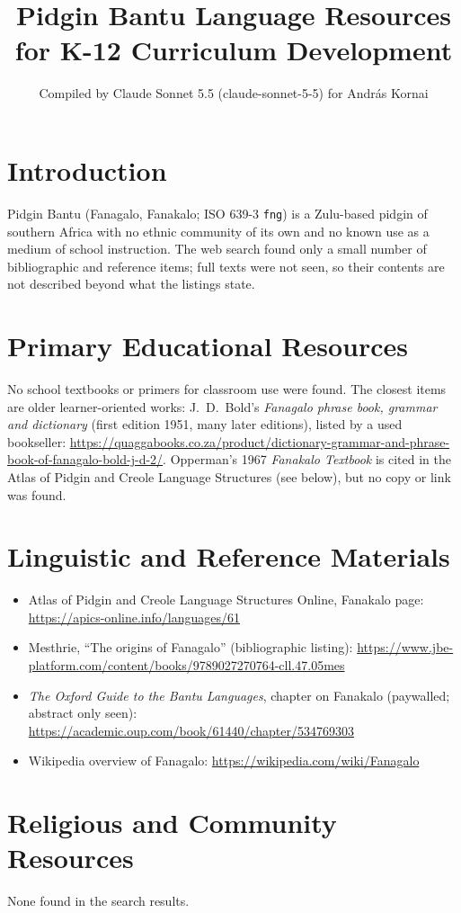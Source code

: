 \documentclass[12pt]{article}
\title{Pidgin Bantu Language Resources for K-12 Curriculum Development}
\author{Compiled by Claude Sonnet 5.5 (claude-sonnet-5-5) for Andr\'as Kornai}
\date{}
\begin{document}
\maketitle

\section{Introduction}
Pidgin Bantu (Fanagalo, Fanakalo; ISO 639-3 \texttt{fng}) is a Zulu-based pidgin of southern Africa with no ethnic community of its own and no known use as a medium of school instruction. The web search found only a small number of bibliographic and reference items; full texts were not seen, so their contents are not described beyond what the listings state.

\section{Primary Educational Resources}
No school textbooks or primers for classroom use were found. The closest items are older learner-oriented works: J.\ D.\ Bold's \emph{Fanagalo phrase book, grammar and dictionary} (first edition 1951, many later editions), listed by a used bookseller: \url{https://quaggabooks.co.za/product/dictionary-grammar-and-phrase-book-of-fanagalo-bold-j-d-2/}. Opperman's 1967 \emph{Fanakalo Textbook} is cited in the Atlas of Pidgin and Creole Language Structures (see below), but no copy or link was found.

\section{Linguistic and Reference Materials}
\begin{itemize}
\item Atlas of Pidgin and Creole Language Structures Online, Fanakalo page: \url{https://apics-online.info/languages/61}
\item Mesthrie, ``The origins of Fanagalo'' (bibliographic listing): \url{https://www.jbe-platform.com/content/books/9789027270764-cll.47.05mes}
\item \emph{The Oxford Guide to the Bantu Languages}, chapter on Fanakalo (paywalled; abstract only seen): \url{https://academic.oup.com/book/61440/chapter/534769303}
\item Wikipedia overview of Fanagalo: \url{https://wikipedia.com/wiki/Fanagalo}
\end{itemize}

\section{Religious and Community Resources}
None found in the search results.
\end{document}

